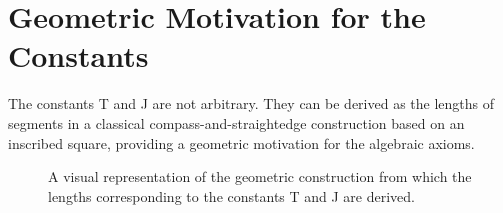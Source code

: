 \documentclass{amsart}
\theoremstyle{plain}
\theoremstyle{definition}
\theoremstyle{remark}
\begin{document}
\appendix
\section{Geometric Motivation for the Constants}
The constants T and J are not arbitrary. They can be derived as the lengths of segments in a classical compass-and-straightedge construction based on an inscribed square, providing a geometric motivation for the algebraic axioms.

\begin{figure}[htbp] %
    \centering
    \caption{A visual representation of the geometric construction from which the lengths corresponding to the constants T and J are derived.}
    \label{fig:geometry}
\end{figure}
\end{document}
